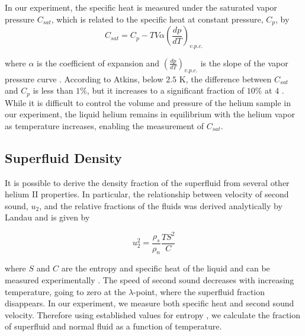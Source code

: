 In our experiment, the specific heat is measured under the saturated
vapor pressure $C_{sat}$, which is related to the specific heat at
constant pressure, $C_p$, by
\begin{equation}\label{formula:satspecificheat}
C_{sat} = C_p - TV\alpha\left(\dfrac{dp}{dT}\right)_{v.p.c.} 
\end{equation}

where $\alpha$ is the coefficient of expansion and
$\left(\frac{dp}{dT}\right)_{v.p.c.}$ is the slope of the vapor
pressure curve \cite{atkins}. According to Atkins, below $2.5$ K, the
difference between $C_{sat}$ and $C_p$ is less than $1\%$, but it
increases to a significant fraction of $10\%$ at $4$
\cite{atkins}. While it is difficult to control the volume and
pressure of the helium sample in our experiment, the liquid helium
remains in equilibrium with the helium vapor as temperature increases,
enabling the measurement of $C_{sat}$.

\subsection{Superfluid Density}

It is possible to derive the density fraction of the superfluid from
several other helium II properties. In particular, the relationship
between velocity of second sound, $u_2$, and the relative fractions of
the fluids was derived analytically by Landau and is given by

\begin{equation}
u_2^2 = \frac{\rho_s}{\rho_n}\frac{T S^2}{C}
\label{soundspeed}
\end{equation}

where $S$ and $C$ are the entropy and specific heat of the
liquid and can be measured experimentally \cite{atkins}. The speed of
second sound decreases with increasing temperature, going to zero at
the $\lambda$-point, where the superfluid fraction disappears. In our
experiment, we measure both specific heat and second sound velocity.
Therefore using established values for entropy \cite{andro}, we calculate
the fraction of superfluid and normal fluid as a function of
temperature.

